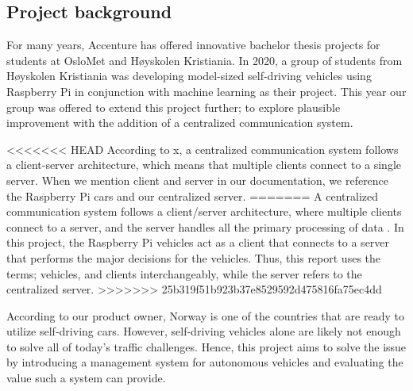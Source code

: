 \subsection{Project background}
For many years, Accenture has offered innovative bachelor thesis projects for students at OsloMet and Høyskolen Kristiania. In 2020, a group of students from Høyskolen Kristiania was developing model-sized self-driving vehicles using Raspberry Pi in conjunction with machine learning as their project. This year our group was offered to extend this project further; to explore plausible improvement with the addition of a centralized communication system.

<<<<<<< HEAD
According to x, a centralized communication system follows a client-server architecture, which means that multiple clients connect to a single server. When we mention client and server in our documentation, we reference the Raspberry Pi cars and our centralized server.
=======
A centralized communication system follows a client/server architecture, where multiple clients connect to a server, and the server handles all the primary processing of data \parencite{centralized}. In this project, the Raspberry Pi vehicles act as a client that connects to a server that performs the major decisions for the vehicles. Thus, this report uses the terms; vehicles, and clients interchangeably, while the server refers to the centralized server.
>>>>>>> 25b319f51b923b37e8529592d475816fa75ec4dd

According to our product owner, Norway is one of the countries that are ready to utilize self-driving cars. However, self-driving vehicles alone are likely not enough to solve all of today's traffic challenges. Hence, this project aims to solve the issue by introducing a management system for autonomous vehicles and evaluating the value such a system can provide.
